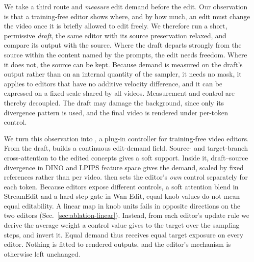 We take a third route and \emph{measure} edit demand before the edit.
Our observation is that a training-free editor shows where, and by how much, an edit must change the video once it is briefly allowed to edit freely.
We therefore run a short, permissive \emph{draft}, the same editor with its source preservation relaxed, and compare its output with the source.
Where the draft departs strongly from the source within the content named by the prompts, the edit needs freedom. Where it does not, the source can be kept.
Because demand is measured on the draft's output rather than on an internal quantity of the sampler, it needs no mask, it applies to editors that have no additive velocity difference, and it can be expressed on a fixed scale shared by all videos.
Measurement and control are thereby decoupled. The draft may damage the background, since only its divergence pattern is used, and the final video is rendered under per-token control.

We turn this observation into \method, a plug-in controller for training-free video editors.
From the draft, \method builds a continuous edit-demand field.
Source- and target-branch cross-attention to the edited concepts gives a soft support. Inside it, draft--source divergence in DINO and LPIPS feature space gives the demand, scaled by fixed references rather than per video.
\method then sets the editor's \emph{own} control separately for each token.
Because editors expose different controls, a soft attention blend in StreamEdit and a hard step gate in Wan-Edit, equal knob values do not mean equal editability. A linear map in knob units fails in opposite directions on the two editors (Sec.~\ref{sec:ablation-linear}).
Instead, from each editor's update rule we derive the average weight a control value gives to the target over the sampling steps, and invert it. Equal demand thus receives equal target exposure on every editor.
Nothing is fitted to rendered outputs, and the editor's mechanism is otherwise left unchanged.

